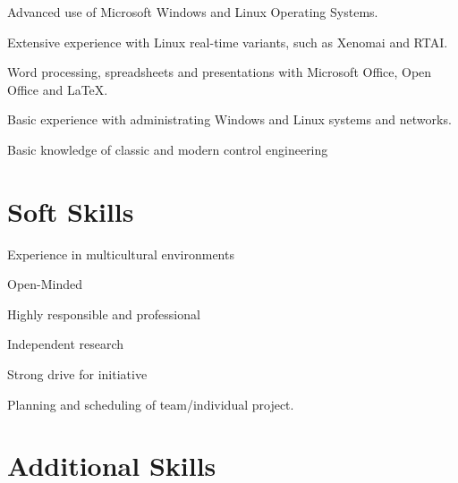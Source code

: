 {
Advanced use of Microsoft Windows and Linux Operating Systems.

Extensive experience with Linux real-time variants, such as Xenomai and RTAI.

Word processing, spreadsheets and presentations with Microsoft Office, Open
Office and \LaTeX.

Basic experience with administrating Windows and Linux systems and networks.

Basic knowledge of classic and modern control engineering
}


\section*{Soft Skills}

{
Experience in multicultural environments

Open-Minded

Highly responsible and professional
}

{
Independent research

Strong drive for initiative

Planning and scheduling of team/individual project.
}

\section*{Additional Skills}



